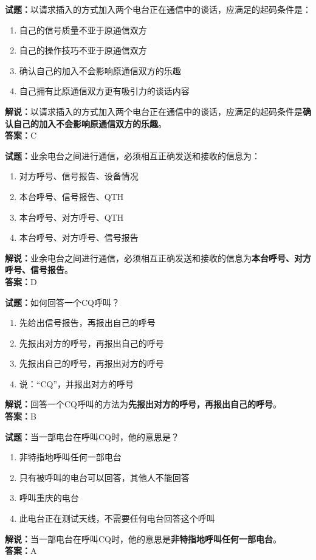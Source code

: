 \documentclass{ctexbook}
\begin{document}
\bigskip


\noindent\textbf{试题：}以请求插入的方式加入两个电台正在通信中的谈话，应满足的起码条件是：
\begin{enumerate}[leftmargin=3em]
	\item 自己的信号质量不亚于原通信双方
	\item 自己的操作技巧不亚于原通信双方
	\item 确认自己的加入不会影响原通信双方的乐趣
	\item 自己拥有比原通信双方更有吸引力的谈话内容
\end{enumerate}
\noindent\textbf{解说：}以请求插入的方式加入两个电台正在通信中的谈话，应满足的起码条件是\textbf{确认自己的加入不会影响原通信双方的乐趣}。\\\noindent\textbf{答案：}C


\bigskip


\noindent\textbf{试题：}业余电台之间进行通信，必须相互正确发送和接收的信息为：
\begin{enumerate}[leftmargin=3em]
	\item 对方呼号、信号报告、设备情况
	\item 本台呼号、信号报告、QTH
	\item 本台呼号、对方呼号、QTH
	\item 本台呼号、对方呼号、信号报告
\end{enumerate}
\noindent\textbf{解说：}业余电台之间进行通信，必须相互正确发送和接收的信息为\textbf{本台呼号、对方呼号、信号报告}。\\\noindent\textbf{答案：}D


\bigskip


\noindent\textbf{试题：}如何回答一个CQ呼叫？
\begin{enumerate}[leftmargin=3em]
	\item 先给出信号报告，再报出自己的呼号
	\item 先报出对方的呼号，再报出自己的呼号
	\item 先报出自己的呼号，再报出对方的呼号
	\item 说：“CQ”，并报出对方的呼号
\end{enumerate}
\noindent\textbf{解说：}回答一个CQ呼叫的方法为\textbf{先报出对方的呼号，再报出自己的呼号}\cite{yeyuwuxiandiantongxin}。\\
\noindent\textbf{答案：}B


\bigskip


\noindent\textbf{试题：}当一部电台在呼叫CQ时，他的意思是？
\begin{enumerate}[leftmargin=3em]
	\item 非特指地呼叫任何一部电台
	\item 只有被呼叫的电台可以回答，其他人不能回答
	\item 呼叫重庆的电台
	\item 此电台正在测试天线，不需要任何电台回答这个呼叫
\end{enumerate}
\noindent\textbf{解说：}当一部电台在呼叫CQ时，他的意思是\textbf{非特指地呼叫任何一部电台}。\\\noindent\textbf{答案：}A
\end{document}
